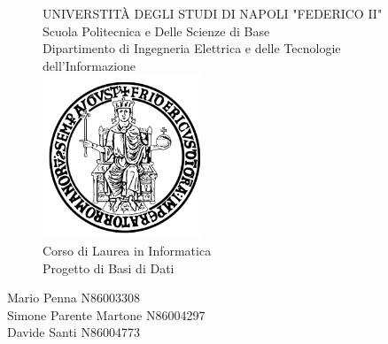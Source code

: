 \documentclass{report}
\begin{document}
\begin{sloppypar}
    \begin{figure}[htbp!]
        \begin{center}
            UNIVERSTIT\`A DEGLI STUDI DI NAPOLI "FEDERICO II" \\
            Scuola Politecnica e Delle Scienze di Base \\
            Dipartimento di Ingegneria Elettrica e delle Tecnologie dell'Informazione \\
            \includegraphics[width=.25\textwidth]{Immagini/FedericoII.png} \\
            Corso di Laurea in Informatica \\
            Progetto di Basi di Dati \\
        \end{center}
    \end{figure}

    \begin{center}
        Mario Penna N86003308 \\ Simone Parente Martone N86004297 \\ Davide Santi N86004773
    \end{center}
    
    \newpage
    
    \tableofcontents
    
    
    
    

\end{sloppypar}

    
\end{document}
